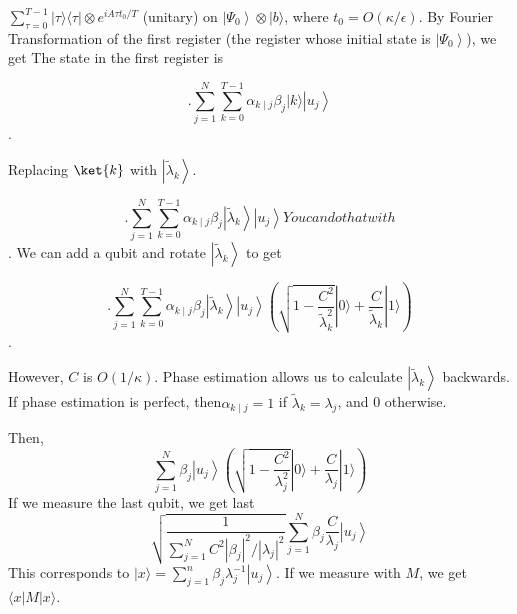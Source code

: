 \documentclass[b5paper,papersize,dvipdfmx,fleqn]{article}
\begin{document}
$\sum_{\tau=0}^{T-1}|\tau\rangle\langle\tau|\otimes e^{i A \tau t_{0} / T}$ (unitary) on $\left|\Psi_{0}\right\rangle\otimes|b\rangle$, where $t_{0}=O(\kappa / \epsilon)$. By Fourier Transformation of the first register (the register whose initial state is $\left|\Psi_{0}\right\rangle$), we get The state in the first register is

$$.
\sum_{j=1}^{N} \sum_{k=0}^{T-1} \alpha_{k \mid j} \beta_{j}|k\rangle\left|u_{j}\right\rangle
$$.

Replacing $\ket{k}$ with $\left|\tilde{\lambda}_{k}\right\rangle$.

$$.
\sum_{j=1}^{N} \sum_{k=0}^{T-1} \alpha_{k \mid j} \beta_{j}\left|\tilde{\lambda}_{k}\right\rangle\left|u_{j}\right\rangle
You can do that with $$.
We can add a qubit and rotate $\left|\tilde{\lambda}_{k}\right\rangle$ to get

$$.
\sum_{j=1}^{N} \sum_{k=0}^{T-1} \alpha_{k \mid j} \beta_{j}\left|\tilde{\lambda}_{k}\right\rangle\left|u_{j}\right\rangle\left(\sqrt{1-\frac{C^{2}}{\tilde{\lambda}_{k}^{2}}}|0\rangle+\frac{C}{\tilde{\lambda}_{k}}|1\rangle\right)
$$.

However, $C$ is $O(1 / \kappa)$. Phase estimation allows us to calculate $\left|\tilde{\lambda}_{k}\right\rangle $ backwards. If phase estimation is perfect, then$\alpha_{k \mid j}=1$ if $\tilde{\lambda}_{k}=\lambda_{j}$, and 0 otherwise.

Then,
$$
\sum_{j=1}^{N} \beta_{j}\left|u_{j}\right\rangle\left(\sqrt{1-\frac{C^{2}}{\lambda_{j}^{2}}}|0\rangle+\frac{C}{\lambda_{j}}|1\rangle\right)
$$
If we measure the last qubit, we get last
$$
\sqrt{\frac{1}{\sum_{j=1}^{N} C^{2}\left|\beta_{j}\right|^{2} /\left|\lambda_{j}\right|^{2}}} \sum_{j=1}^{N} \beta_{j} \frac{C}{\lambda_{j}}\left|u_{j}\right\rangle
$$
This corresponds to $|x\rangle=\sum_{j=1}^{n}\beta_{j}\lambda_{j}^{-1}\left|u_{j}\right\rangle$. If we measure with $M$, we get $\langle x|M| x\rangle$.
\end{document}
